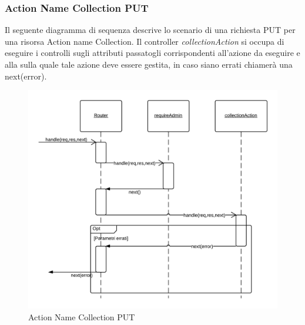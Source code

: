\subsubsection{Action Name Collection PUT} 
Il seguente diagramma di sequenza descrive lo scenario di una richiesta PUT per una risorsa Action name Collection.
Il controller \emph{collectionAction} si occupa di eseguire i controlli sugli attributi passatogli corrispondenti all'azione da eseguire e alla  sulla quale tale azione deve essere gestita, in caso siano errati chiamerà una next(error).
\begin{figure}[H]
	\begin{center} 
		\includegraphics[scale=0.20]{scenari/Action Name Collection PUT.png} 
		\caption{Action Name Collection PUT}
	\end{center} 
\end{figure}

